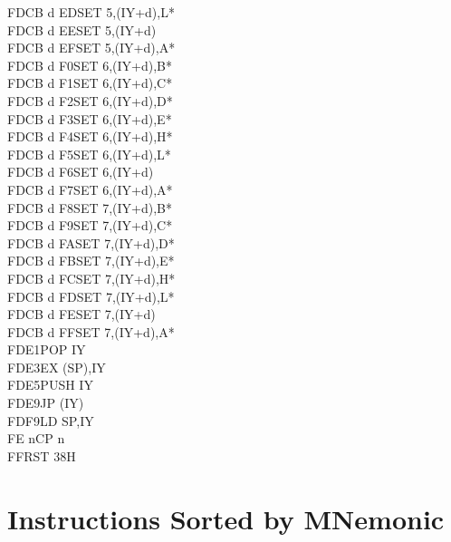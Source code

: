 \documentclass[oneside,a4paper]{book}
\begin{document}
\begin{multicols}{3}
{\begin{tabbing}
FDCB d ED\>SET 5,(IY+d),L*\\
FDCB d EE\>SET 5,(IY+d)\\
FDCB d EF\>SET 5,(IY+d),A*\\
FDCB d F0\>SET 6,(IY+d),B*\\
FDCB d F1\>SET 6,(IY+d),C*\\
FDCB d F2\>SET 6,(IY+d),D*\\
FDCB d F3\>SET 6,(IY+d),E*\\
FDCB d F4\>SET 6,(IY+d),H*\\
FDCB d F5\>SET 6,(IY+d),L*\\
FDCB d F6\>SET 6,(IY+d)\\
FDCB d F7\>SET 6,(IY+d),A*\\
FDCB d F8\>SET 7,(IY+d),B*\\
FDCB d F9\>SET 7,(IY+d),C*\\
FDCB d FA\>SET 7,(IY+d),D*\\
FDCB d FB\>SET 7,(IY+d),E*\\
FDCB d FC\>SET 7,(IY+d),H*\\
FDCB d FD\>SET 7,(IY+d),L*\\
FDCB d FE\>SET 7,(IY+d)\\
FDCB d FF\>SET 7,(IY+d),A*\\
FDE1\>POP IY\\
FDE3\>EX (SP),IY\\
FDE5\>PUSH IY\\
FDE9\>JP (IY)\\
FDF9\>LD SP,IY\\
FE n\>CP n\\
FF\>RST 38H
\end{tabbing}
}
\end{multicols}
\normalsize

\chapter{Instructions Sorted by MNemonic}
\end{document}
